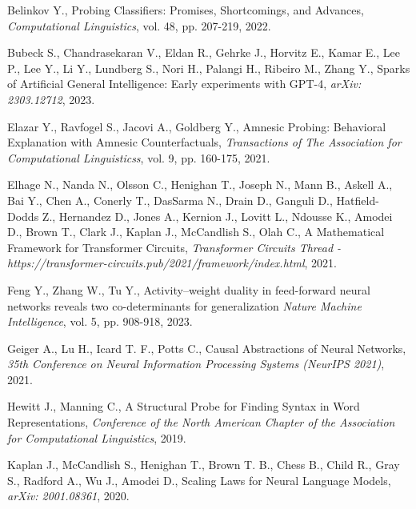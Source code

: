\documentclass[final,1p,times,authoryear]{elsarticle}
\begin{document}
\begin{thebibliography}{00}


Belinkov Y., Probing Classifiers: Promises, Shortcomings, and Advances, {\em Computational Linguistics}, vol. 48, pp. 207-219, 2022.

Bubeck S., Chandrasekaran V., Eldan R., Gehrke J., Horvitz E., Kamar E., Lee P., Lee Y., Li Y., Lundberg S., Nori H., Palangi H., Ribeiro M., Zhang Y., Sparks of Artificial General Intelligence: Early experiments with GPT-4, {\em arXiv: 2303.12712}, 2023.

Elazar Y., Ravfogel S., Jacovi A., Goldberg Y., Amnesic Probing: Behavioral Explanation with Amnesic Counterfactuals, {\em Transactions of The Association for Computational Linguisticss}, vol. 9, pp. 160-175, 2021.

Elhage N., Nanda N., Olsson C., Henighan T., Joseph N., Mann B., Askell A., Bai Y., Chen A., Conerly T., DasSarma N., Drain D., Ganguli D., Hatfield-Dodds Z., Hernandez D., Jones A., Kernion J., Lovitt L., Ndousse K., Amodei D., Brown T., Clark J., Kaplan J., McCandlish S., Olah C., A Mathematical Framework for Transformer Circuits, {\em Transformer Circuits Thread - https://transformer-circuits.pub/2021/framework/index.html}, 2021.

Feng Y., Zhang W., Tu Y., Activity–weight duality in feed-forward neural networks reveals two co-determinants for generalization {\em Nature Machine Intelligence}, vol. 5, pp. 908-918, 2023.

Geiger A., Lu H., Icard T. F., Potts C., Causal Abstractions of Neural Networks, {\em 35th Conference on Neural Information Processing Systems (NeurIPS 2021)}, 2021.

Hewitt J., Manning C., A Structural Probe for Finding Syntax in Word Representations, {\em Conference of the North American Chapter of the Association for Computational Linguistics}, 2019.

Kaplan J., McCandlish S., Henighan T., Brown T. B., Chess B., Child R., Gray S., Radford A., Wu J., Amodei D., Scaling Laws for Neural Language Models, {\em arXiv: 2001.08361}, 2020.


\end{thebibliography}
\end{document}
